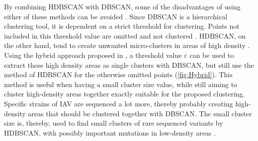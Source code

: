 By combining \gls{HDBSCAN} with \gls{DBSCAN}, some of the disadvantages of using either of these methods can be avoided \autocite{mcinnes_hdbscan_2017, moulavi_density-based_2014}. Since \gls{DBSCAN} is a hierarchical clustering tool, it is dependent on a strict threshold for clustering. Points not included in this threshold value are omitted and not clustered \autocite{ester_density-based_1996, schubert_dbscan_2017}. \gls{HDBSCAN}, on the other hand, tend to create unwanted micro-clusters in areas of high density \autocite{mcinnes_hdbscan_2017}. Using the hybrid approach proposed in \autocite{malzer_hybrid_2020}, a threshold value $\varepsilon$ can be used to extract these high density areas as single clusters with \gls{DBSCAN}, but still use the method of \gls{HDBSCAN} for the otherwise omitted points (\autoref{fig:Hybrid}). This method is useful when having a small cluster size value, while still aiming to cluster high-density areas together exactly suitable for the proposed clustering. Specific strains of \gls{IAV} are sequenced a lot more, thereby probably creating high-density areas that should be clustered together with \gls{DBSCAN}. The small cluster size is, thereby, used to find small clusters of rare sequenced variants by \gls{HDBSCAN}, with possibly important mutations in low-density areas \autocite{malzer_hybrid_2020}.

